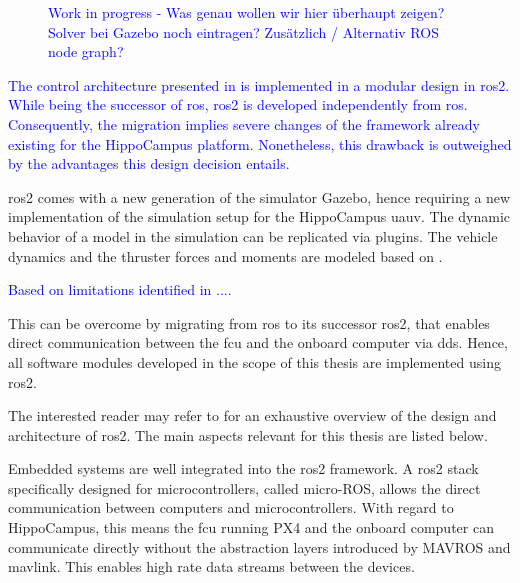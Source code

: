 \begin{figure}
\begin{tikzpicture}
		

	\end{tikzpicture}
	\caption{\textcolor{blue}{Work in progress - Was genau wollen wir hier überhaupt zeigen? Solver bei Gazebo noch eintragen? Zusätzlich / Alternativ ROS node graph?}}
	\label{fig:control_architecture}
\end{figure}


\textcolor{blue}{
The control architecture presented in  is implemented in a modular design in \ac{ros2}. While being the successor of \ac{ros}, \ac{ros2} is developed independently from \ac{ros}.
Consequently, the migration implies severe changes of the framework already existing for the HippoCampus platform. Nonetheless, this drawback is outweighed by the advantages this design decision entails. }

\ac{ros2} comes with a new generation of the simulator Gazebo, hence requiring a new implementation of the simulation setup for the HippoCampus \ac{uauv}. The dynamic behavior of a model in the simulation can be replicated via plugins. The vehicle dynamics and the thruster forces and moments are modeled based on  .


\textcolor{blue}{Based on limitations identified in ....}

This can be overcome by migrating from \ac{ros} to its successor \ac{ros2}, that enables direct communication between the \ac{fcu} and the onboard computer via \ac{dds}. Hence, all software modules developed in the scope of this thesis are implemented using \ac{ros2}.

The interested reader may refer to \cite{ros2} for an exhaustive overview of the design and architecture of \ac{ros2}. The main aspects relevant for this thesis are listed below.

Embedded systems are well integrated into the \ac{ros2} framework. A \ac{ros2} stack specifically designed for microcontrollers, called micro-ROS, allows the direct communication between computers and microcontrollers. With regard to HippoCampus, this means the \ac{fcu} running PX4 and the onboard computer can communicate directly without the abstraction layers introduced by MAVROS and \ac{mavlink}. This enables high rate data streams between the devices.

